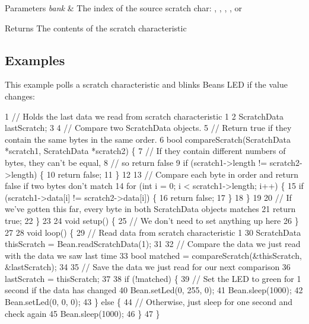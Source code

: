 \begin{DoxyParams}{Parameters}
{\em bank} & The index of the source scratch char\+: {}, {}, {}, {}, or {}\\
\hline
\end{DoxyParams}
\begin{DoxyReturn}{Returns}
The contents of the scratch characteristic
\end{DoxyReturn}
\subsection*{Examples}

This example polls a scratch characteristic and blinks Bean\textquotesingle{}s L\+E\+D if the value changes\+:


\begin{DoxyCodeInclude}
1 // Holds the last data we read from scratch characteristic 1
2 ScratchData lastScratch;
3 
4 // Compare two ScratchData objects.
5 // Return true if they contain the same bytes in the same order.
6 bool compareScratch(ScratchData *scratch1, ScratchData *scratch2) \{
7   // If they contain different numbers of bytes, they can't be equal,
8   // so return false
9   if (scratch1->length != scratch2->length) \{
10     return false;
11   \}
12 
13   // Compare each byte in order and return false if two bytes don't match
14   for (int i = 0; i < scratch1->length; i++) \{
15     if (scratch1->data[i] != scratch2->data[i]) \{
16       return false;
17     \}
18   \}
19 
20   // If we've gotten this far, every byte in both ScratchData objects matches
21   return true;
22 \}
23 
24 void setup() \{
25   // We don't need to set anything up here
26 \}
27 
28 void loop() \{
29   // Read data from scratch characteristic 1
30   ScratchData thisScratch = Bean.readScratchData(1);
31 
32   // Compare the data we just read with the data we saw last time
33   bool matched = compareScratch(&thisScratch, &lastScratch);
34 
35   // Save the data we just read for our next comparison
36   lastScratch = thisScratch;
37 
38   if (!matched) \{
39     // Set the LED to green for 1 second if the data has changed
40     Bean.setLed(0, 255, 0);
41     Bean.sleep(1000);
42     Bean.setLed(0, 0, 0);
43   \} else \{
44     // Otherwise, just sleep for one second and check again
45     Bean.sleep(1000);
46   \}
47 \}
\end{DoxyCodeInclude}
 \hypertarget{class_bean_class_a4c835abe680607ce956af4f7fa965a20}{}
